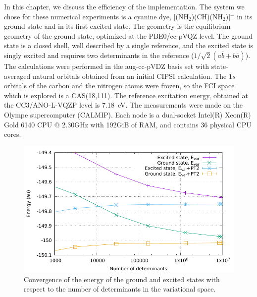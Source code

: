 \documentclass[./thesis.tex]{subfiles}
\begin{document}
In this chapter, we discuss the efficiency of the implementation. The system
we chose for these numerical experiments is a cyanine dye,
[(NH$_2$)(CH)(NH$_2$)]$^+$ in its ground state and in its first excited state.
The geometry is the equilibrium geometry of the ground state, optimized at the
PBE0/cc-pVQZ level. The ground state is a closed shell, well described by a
single reference, and the excited state is singly excited and requires two
determinants in the reference ($1/\sqrt{2} (a\bar{b} + b\bar{a})$).  The
calculations were performed in the aug-cc-pVDZ basis set with state-averaged
natural orbitals obtained from an initial CIPSI calculation.
The $1s$ orbitals of the carbon and the nitrogen atoms were frozen, so
the FCI space which is explored is a CAS(18,111). The reference excitation
energy, obtained at the CC3/ANO-L-VQZP level is 7.18~eV\cite{Send_2011}.
The measurements were made on the Olympe supercomputer (CALMIP). Each node is 
a dual-socket Intel(R) Xeon(R) Gold 6140 CPU @ 2.30GHz with 192GiB of RAM, and
contains 36 physical CPU cores.

\begin{figure}[h]
	\begin{center}
		\includegraphics[width=0.8\columnwidth]{figures/perf/cn3_energy}
		\caption{Convergence of the energy of the ground and excited states with respect to the number of determinants in the variational space.}
		\label{fig:energy_pt2}
	\end{center}
\end{figure}
\end{document}
